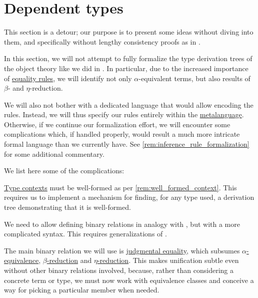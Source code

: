 \section{Dependent types}\label{sec:dependent_types}

This section is a detour; our purpose is to present some ideas without diving into them, and specifically without lengthy consistency proofs as in .

\begin{remark}\label{rem:dependent_type_rule_formalization}
  In this section, we will not attempt to fully formalize the type derivation trees of the object theory like we did in . In particular, due to the increased importance of \hyperref[rem:type_theory_rule_classification/equality]{equality rules}, we will identify not only \( \alpha \)-equivalent terms, but also results of \( \beta \)- and \( \eta \)-reduction.

  We will also not bother with a dedicated language that would allow encoding the rules. Instead, we will thus specify our rules entirely within the \hyperref[con:metalanguage]{metalanguage}. Otherwise, if we continue our formalization effort, we will encounter some complications which, if handled properly, would result a much more intricate formal language than we currently have. See \cref{rem:inference_rule_formalization} for some additional commentary.

  We list here some of the complications:
  \begin{thmenum}
     \hyperref[def:type_context]{Type contexts} must be well-formed as per \cref{rem:well_formed_context}. This requires us to implement a mechanism for finding, for any type used, a derivation tree demonstrating that it is well-formed.

     We need to allow defining binary relations in analogy with , but with a more complicated syntax. This requires generalizations of .

     The main binary relation we will use is \hyperref[con:equality]{judgmental equality}, which subsumes \hyperref[def:lambda_term_alpha_equivalence]{\( \alpha \)-equivalence}, \hyperref[def:typed_term_reduction]{\( \beta \)-reduction} and \hyperref[def:typed_term_reduction]{\( \eta \)-reduction}. This makes unification subtle even without other binary relations involved, because, rather than considering a concrete term or type, we must now work with equivalence classes and conceive a way for picking a particular member when needed.


\end{thmenum}
\end{remark}
